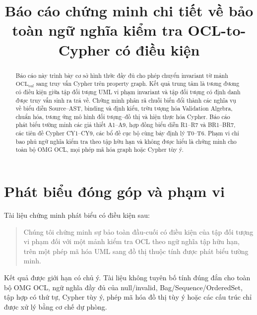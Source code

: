\documentclass[11pt,a4paper]{article}
\title{Báo cáo chứng minh chi tiết về bảo toàn ngữ nghĩa kiểm tra OCL-to-Cypher có điều kiện}
\author{}
\date{}
\theoremstyle{definition}
\newcommand{\OCLval}{\mathrm{OCL}_{val}}
\begin{document}
\maketitle

\noindent{}
\medskip

\begin{abstract}
Báo cáo này trình bày cơ sở hình thức đầy đủ cho phép chuyển invariant từ mảnh
$\OCLval$ sang truy vấn Cypher trên property graph. Kết quả trung tâm là tương
đương có điều kiện giữa tập đối tượng UML vi phạm invariant và tập đối tượng có
định danh được truy vấn sinh ra trả về. Chứng minh phân rã chuỗi biến đổi thành
các nghĩa vụ về biểu diễn Source--AST, binding và định kiểu, trừu tượng hóa
Validation Algebra, chuẩn hóa, tương ứng mô hình đối tượng--đồ thị và hiện thực
hóa Cypher. Báo cáo phát biểu tường minh các giả thiết A1--A9, hợp đồng biểu
diễn R1--R7 và BR1--BR7, các tiên đề Cypher CY1--CY9, các bổ đề cục bộ cùng bảy
định lý T0--T6. Phạm vi chỉ bao phủ ngữ nghĩa kiểm tra theo tập hữu hạn và
không được hiểu là chứng minh cho toàn bộ OMG OCL, mọi phép mã hóa graph hoặc
Cypher tùy ý.
\end{abstract}

\tableofcontents
\newpage

\section{Phát biểu đóng góp và phạm vi}

Tài liệu chứng minh phát biểu có điều kiện sau:

\begin{quote}
Chúng tôi chứng minh sự bảo toàn đầu-cuối có điều kiện của tập đối tượng vi
phạm đối với một mảnh kiểm tra OCL theo ngữ nghĩa tập hữu hạn, trên một phép mã
hóa UML sang đồ thị thuộc tính được phát biểu tường minh.
\end{quote}

Kết quả được giới hạn có chủ ý. Tài liệu không tuyên bố tính đúng đắn cho toàn
bộ OMG OCL, ngữ nghĩa đầy đủ của null/invalid, Bag/Sequence/OrderedSet, tập hợp
có thứ tự, Cypher tùy ý, phép mã hóa đồ thị tùy ý hoặc các cấu trúc chỉ được xử
lý bằng cơ chế dự phòng.
\end{document}
